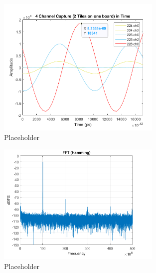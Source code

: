 \begin{figure}[H]
	\centering
	\includegraphics[width = 0.7\textwidth]{chap/04-characterization/img/plot1.png}
	\caption{Placeholder}
	\label{fig:plot1}
\end{figure}
\begin{figure}[H]
	\centering
	\includegraphics[width = 0.7\textwidth]{chap/04-characterization/img/plot2.png}
	\caption{Placeholder}
	\label{fig:plot2}
\end{figure}


